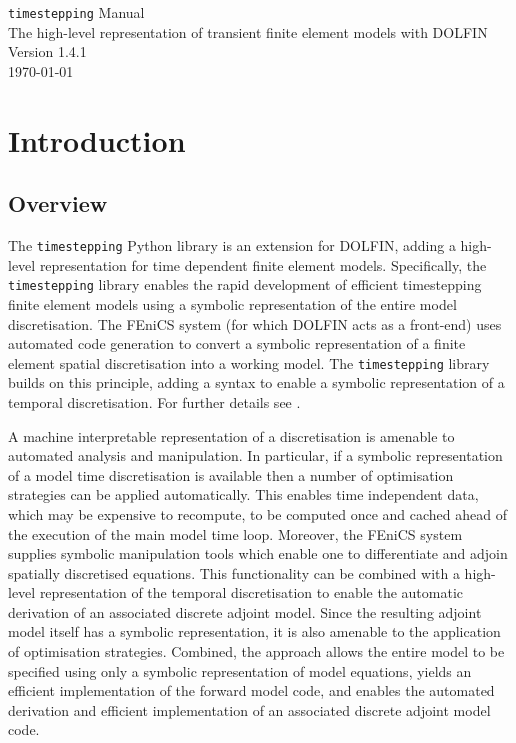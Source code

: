 \documentclass[a4paper]{book}
\newcommand{\version}{1.4.1}
\begin{document}
\begin{titlepage}
\begin{center}

\Huge{\verb+timestepping+ Manual} \\[0.02\textheight]
\large{The high-level representation of transient finite element models with DOLFIN} \\[0.02\textheight]
\Huge{Version \version} \\[0.15\textheight]
\vfill
\large{\today}

\end{center}
\end{titlepage}

\tableofcontents

\chapter{Introduction}

\section{Overview}

The \verb+timestepping+ Python library is an extension for DOLFIN, adding a
high-level representation for time dependent finite element models.
Specifically, the \verb+timestepping+ library enables the rapid development of
efficient timestepping finite element models using a symbolic representation of
the entire model discretisation. The FEniCS system (for which DOLFIN acts as a
front-end) uses automated code generation to convert a symbolic representation
of a finite element spatial discretisation into a working model. The
\verb+timestepping+ library builds on this principle, adding a syntax to enable
a symbolic representation of a temporal discretisation. For further details
see \citet{maddison2014}.

A machine interpretable representation of a discretisation is amenable to
automated analysis and manipulation. In particular, if a symbolic representation
of a model time discretisation is available then a number of optimisation
strategies can be applied automatically. This enables time independent data,
which may be expensive to recompute, to be computed once and cached ahead of the
execution of the main model time loop. Moreover, the FEniCS system supplies
symbolic manipulation tools which enable one to differentiate and adjoin
spatially discretised equations. This functionality can be combined with a
high-level representation of the temporal discretisation to enable the automatic
derivation of an associated discrete adjoint model. Since the resulting adjoint
model itself has a symbolic representation, it is also amenable to the
application of optimisation strategies. Combined, the approach allows the entire
model to be specified using only a symbolic representation of model equations,
yields an efficient implementation of the forward model code, and enables the
automated derivation and efficient implementation of an associated discrete
adjoint model code.
\end{document}
